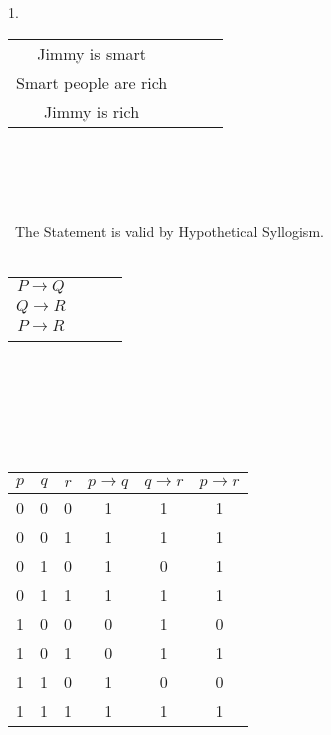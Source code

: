 \documentclass[11pt]{article}
\begin{document}
1.  
\begin{tabular}{cccc}
 Jimmy  is smart \\
 Smart people  are rich \\
\hline
Jimmy is rich\\
\end{tabular}\\\\\\\\\
The Statement is valid by Hypothetical Syllogism. \\\\
\begin{tabular}{cccc}
$ P \rightarrow Q $ \\
$ Q \rightarrow R $ \\
\hline
$ P \rightarrow R $\\
\\\end{tabular}\\\\\\\\\
\begin{tabular}{|c|c|c|c|c|c|}
\hline
$p$ & $q$ & $r$ & $p \to q$ & $q \to r$ & $p \to r$ \\
\hline
0 & 0 & 0 & 1 & 1 & 1 \\
0 & 0 & 1 & 1 & 1 & 1 \\
0 & 1 & 0 & 1 & 0 & 1 \\
0 & 1 & 1 & 1 & 1 & 1 \\
1 & 0 & 0 & 0 & 1 & 0 \\
1 & 0 & 1 & 0 & 1 & 1 \\
1 & 1 & 0 & 1 & 0 & 0 \\
1 & 1 & 1 & 1 & 1 & 1 \\
\hline
\end{tabular}
\end{document}
